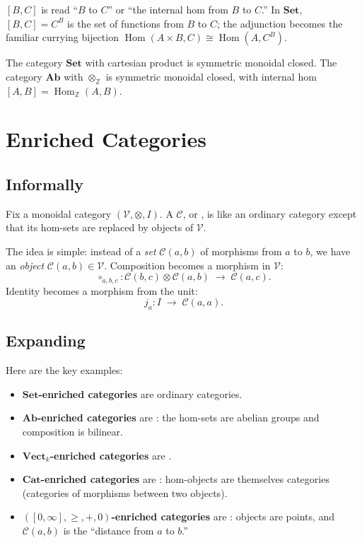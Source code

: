 \begin{howtosay}
$[B, C]$ is read ``$B$ to $C$'' or ``the internal hom from $B$ to $C$.'' In
$\mathbf{Set}$, $[B, C] = C^B$ is the set of functions from $B$ to $C$; the
adjunction becomes the familiar currying bijection
$\operatorname{Hom}(A \times B, C) \cong \operatorname{Hom}(A, C^B)$.
\end{howtosay}

The category $\mathbf{Set}$ with cartesian product is symmetric monoidal closed.
The category $\mathbf{Ab}$ with $\otimes_{\mathbb{Z}}$ is symmetric monoidal closed,
with internal hom $[A, B] = \operatorname{Hom}_{\mathbb{Z}}(A, B)$.

\section{Enriched Categories}

\subsection{Informally}

Fix a monoidal category $(\mathcal{V}, \otimes, I)$. A  $\mathcal{C}$, or , is like an ordinary
category except that its hom-sets are replaced by objects of $\mathcal{V}$.

The idea is simple: instead of a \emph{set} $\mathcal{C}(a, b)$ of morphisms
from $a$ to $b$, we have an \emph{object} $\mathcal{C}(a, b) \in \mathcal{V}$.
Composition becomes a morphism in $\mathcal{V}$:
\[
  \circ_{a,b,c} : \mathcal{C}(b, c) \otimes \mathcal{C}(a, b) \;\to\; \mathcal{C}(a, c).
\]
Identity becomes a morphism from the unit:
\[
  j_a : I \;\to\; \mathcal{C}(a, a).
\]

\subsection{Expanding}

Here are the key examples:

\begin{itemize}
  \item \textbf{$\mathbf{Set}$-enriched categories} are ordinary categories.
  \item \textbf{$\mathbf{Ab}$-enriched categories} are :
    the hom-sets are abelian groups and composition is bilinear.
  \item \textbf{$\mathbf{Vect}_k$-enriched categories} are .
  \item \textbf{$\mathbf{Cat}$-enriched categories} are :
    hom-objects are themselves categories (categories of morphisms between two objects).
  \item \textbf{$([0,\infty], \geq, +, 0)$-enriched categories} are :
    objects are points, and $\mathcal{C}(a,b)$ is the ``distance from $a$ to $b$.''
\end{itemize}

